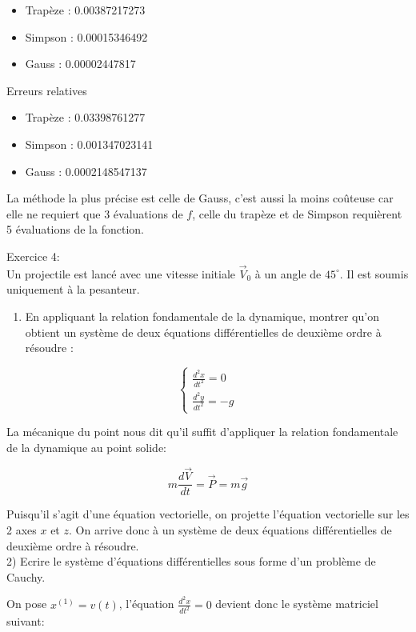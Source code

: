 \documentclass[10pt]{article}
\begin{document}
\begin{itemize}
  \item Trapèze : 0.00387217273
  \item Simpson : 0.00015346492
  \item Gauss : 0.00002447817
\end{itemize}

Erreurs relatives

\begin{itemize}
  \item Trapèze : 0.03398761277
  \item Simpson : 0.001347023141
  \item Gauss : 0.0002148547137
\end{itemize}

La méthode la plus précise est celle de Gauss, c'est aussi la moins coûteuse car elle ne requiert que 3 évaluations de \(f\), celle du trapèze et de Simpson requièrent 5 évaluations de la fonction.

Exercice 4:\\
Un projectile est lancé avec une vitesse initiale \(\vec{V}_{0}\) à un angle de \(45^{\circ}\). Il est soumis uniquement à la pesanteur.

\begin{enumerate}
  \item En appliquant la relation fondamentale de la dynamique, montrer qu'on obtient un système de deux équations différentielles de deuxième ordre à résoudre :
\end{enumerate}

\[
\left\{\begin{array}{c}
\frac{d^{2} x}{d t^{2}}=0 \\
\frac{d^{2} y}{d t^{2}}=-g
\end{array}\right.
\]

La mécanique du point nous dit qu'il suffit d'appliquer la relation fondamentale de la dynamique au point solide:

\[
m \frac{d \vec{V}}{d t}=\vec{P}=m \vec{g}
\]

Puisqu'il s'agit d'une équation vectorielle, on projette l'équation vectorielle sur les 2 axes \(x\) et \(z\). On arrive donc à un système de deux équations différentielles de deuxième ordre à résoudre.\\
2) Ecrire le système d'équations différentielles sous forme d'un problème de Cauchy.

On pose \(x^{(1)}=v(t)\), l'équation \(\frac{d^{2} x}{d t^{2}}=0\) devient donc le système matriciel suivant:
\end{document}
